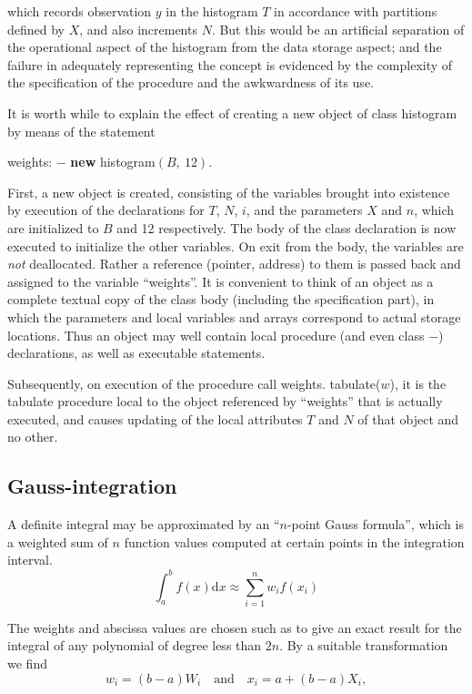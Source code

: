 \documentclass[twoside,11pt]{book}
\begin{document}
\noindent
which records observation $y$ in the histogram $T$ in accordance with partitions defined by $X$, and also increments $N$. But this would be an artificial separation
of the operational aspect of the histogram from the data storage aspect; and the failure in adequately representing the concept is evidenced by the complexity of the specification of the procedure and the awkwardness of its use. 

It is worth while to explain the effect of creating a new object of class histogram by means of the statement

\quad weights: $-$ \textbf{new} histogram$(B,\ 12)$.

\noindent
First, a new object is created, consisting of the variables brought into existence by execution of the declarations for $T$, $N$, $i$, and the parameters $X$ and $n$, which are initialized to $B$ and 12 respectively. The body of the class declaration is now executed to initialize the other variables. On exit from the body, the variables are \textit{not} deallocated. Rather a reference (pointer, address) to them is passed back and assigned to the variable ``weights''. It is convenient to think of an object as a complete textual copy of the class body (including the specification part), in which the parameters and local variables and arrays correspond to actual storage locations. Thus an object may well contain local procedure (and even class $-$) declarations, as well as executable statements.

Subsequently, on execution of the procedure call weights. tabulate($w$), it is the tabulate procedure local to the object referenced by ``weights'' that is actually executed, and causes updating of the local attributes $T$ and $N$ of that object and no other.

\subsection{Gauss-integration}

A definite integral may be approximated by an ``$n$-point Gauss formula'', which is a weighted sum of $n$ function values computed at certain points in the integration interval.
$$
\int_a^b f(x)\text{d}x \approx \sum_{i = 1}^n w_i f(x_i)
$$

\noindent
The weights and abscissa values are chosen such as to give an exact result for the integral of any polynomial of degree less than $2n$. By a suitable transformation we find
$$
w_i = (b - a)W_i \quad\text{and}\quad x_i = a + (b - a)X_i,
$$
\end{document}
